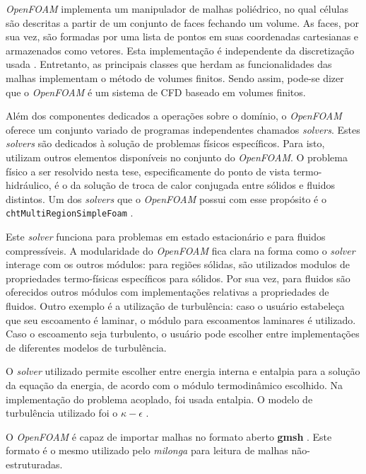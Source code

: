 \textit{OpenFOAM} implementa um manipulador de malhas poliédrico, no qual células são descritas a partir
de um conjunto de faces fechando um volume. As faces, por sua vez, são formadas por uma lista de pontos
em suas coordenadas cartesianas e armazenados como vetores. Esta implementação é independente da discretização
usada \cite{Jasak2009}. Entretanto, as principais classes que herdam as funcionalidades das malhas implementam o método de
volumes finitos. Sendo assim, pode-se dizer que o \textit{OpenFOAM} é um sistema de CFD baseado em volumes
finitos.

Além dos componentes dedicados a operações sobre o domínio, o \textit{OpenFOAM} oferece um conjunto variado
de programas independentes chamados \textit{solvers}. Estes \textit{solvers} são dedicados à solução de
problemas físicos específicos. Para isto, utilizam outros elementos disponíveis no conjunto do
\textit{OpenFOAM}. O problema físico a ser resolvido nesta tese, especificamente do ponto de vista
termo-hidráulico, é o da solução de troca de calor conjugada entre sólidos e
fluidos distintos. Um dos \textit{solvers} que o \textit{OpenFOAM} possui com esse propósito é o
\texttt{chtMultiRegionSimpleFoam} \cite{OpenFOAM2015}.

Este \textit{solver} funciona para problemas em estado estacionário e para
fluidos compressíveis. A modularidade do \textit{OpenFOAM}
fica clara na forma como o \textit{solver} interage com os outros módulos: para regiões sólidas,
são utilizados modulos de propriedades termo-físicas específicos para sólidos. Por sua vez, para
fluidos são oferecidos outros módulos com implementações relativas a propriedades de fluidos.
Outro exemplo é a utilização de turbulência: caso o usuário estabeleça que seu escoamento é laminar,
o módulo para escoamentos laminares é utilizado. Caso o escoamento seja turbulento, o usuário pode
escolher entre implementações de diferentes modelos de turbulência.

O \textit{solver} utilizado permite escolher entre energia interna e entalpia para a solução
da equação da energia, de acordo com o módulo termodinâmico escolhido. Na implementação do
problema acoplado, foi usada entalpia. O modelo de turbulência utilizado foi o $\kappa-\epsilon$
\cite{Launder1974}.


O \textit{OpenFOAM} é capaz de importar malhas no formato aberto \textbf{gmsh} \cite{Geuzane2009}. Este
formato é o mesmo utilizado pelo \textit{milonga} para leitura de malhas não-estruturadas.



